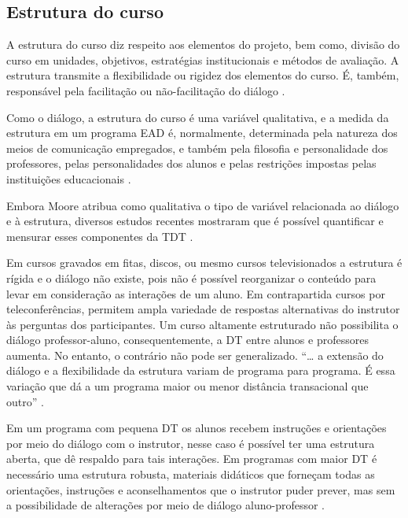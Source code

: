 \subsection{Estrutura do curso}

A estrutura do curso diz respeito aos elementos do projeto, bem como, divisão do
curso em unidades, objetivos, estratégias institucionais e métodos de avaliação.
A estrutura transmite a flexibilidade ou rigidez dos elementos do curso. É,
também, responsável pela facilitação ou não-facilitação do diálogo
\cite{moore2008teoria}.

Como o diálogo, a estrutura do curso é uma variável qualitativa, e a medida da
estrutura em um programa EAD é, normalmente, determinada pela natureza dos meios
de comunicação empregados, e também pela filosofia e personalidade dos
professores, pelas personalidades dos alunos e pelas restrições impostas pelas
instituições educacionais \cite{moore2008teoria}.

Embora Moore atribua como qualitativa o tipo de variável relacionada ao diálogo
e à estrutura, diversos estudos recentes mostraram que é possível quantificar e
mensurar esses componentes da TDT
\cite{zhang2003transactional,horzum2011developing,paul2015revisiting,
ramos2016abordagem}.

Em cursos gravados em fitas, discos, ou mesmo cursos televisionados a estrutura
é rígida e o diálogo não existe, pois não é possível reorganizar o conteúdo para
levar em consideração as interações de um aluno. Em contrapartida cursos por
teleconferências, permitem ampla variedade de respostas alternativas do
instrutor às perguntas dos participantes. Um curso altamente estruturado não
possibilita o diálogo professor-aluno, consequentemente, a DT entre alunos e
professores aumenta. No entanto, o contrário não pode ser generalizado. ``\ldots
a extensão do diálogo e a flexibilidade da estrutura variam de programa para
programa. É essa variação que dá a um programa maior ou menor distância
transacional que outro'' \cite{moore2008teoria}.

Em um programa com pequena DT os alunos recebem instruções e orientações por
meio do diálogo com o instrutor, nesse caso é possível ter uma estrutura aberta,
que dê respaldo para tais interações. Em programas com maior DT é necessário uma
estrutura robusta, materiais didáticos que forneçam todas as orientações,
instruções e aconselhamentos que o instrutor puder prever, mas sem a
possibilidade de alterações por meio de diálogo aluno-professor
\cite{moore2008teoria}.

